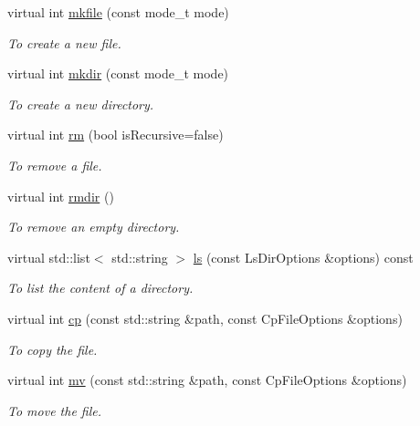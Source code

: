 \begin{DoxyCompactItemize}
virtual int \hyperlink{classSSHFile_aae0e9486c370a13469ec72cbb503638c}{mkfile} (const mode\_\-t mode)
\begin{DoxyCompactList}\small\item\em To create a new file. \item\end{DoxyCompactList}\item 
virtual int \hyperlink{classSSHFile_abceada8383b3731fa3c3a99650928311}{mkdir} (const mode\_\-t mode)
\begin{DoxyCompactList}\small\item\em To create a new directory. \item\end{DoxyCompactList}\item 
virtual int \hyperlink{classSSHFile_a6070540c48390c4b75134229cdfd147d}{rm} (bool isRecursive=false)
\begin{DoxyCompactList}\small\item\em To remove a file. \item\end{DoxyCompactList}\item 
virtual int \hyperlink{classSSHFile_a2e11320295a5f9a70286e4e24c2c106c}{rmdir} ()
\begin{DoxyCompactList}\small\item\em To remove an empty directory. \item\end{DoxyCompactList}\item 
virtual std::list$<$ std::string $>$ \hyperlink{classSSHFile_ab51fb59a5b81be660ca9a39b74591b14}{ls} (const LsDirOptions \&options) const 
\begin{DoxyCompactList}\small\item\em To list the content of a directory. \item\end{DoxyCompactList}\item 
virtual int \hyperlink{classSSHFile_af656c34ec5d57decce27bbe82eba0b3f}{cp} (const std::string \&path, const CpFileOptions \&options)
\begin{DoxyCompactList}\small\item\em To copy the file. \item\end{DoxyCompactList}\item 
virtual int \hyperlink{classSSHFile_a1d803bcc5945bb06ae7434868c34baac}{mv} (const std::string \&path, const CpFileOptions \&options)
\begin{DoxyCompactList}\small\item\em To move the file. \item\end{DoxyCompactList}\end{DoxyCompactItemize}

